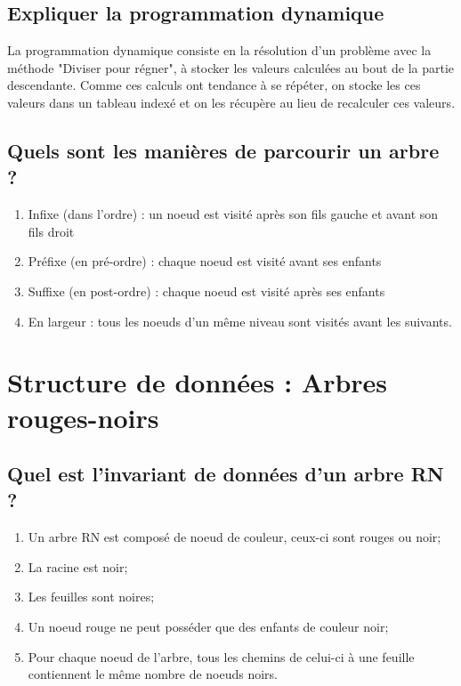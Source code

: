 \documentclass[11pt]{article}
\begin{document}
\subsection{Expliquer la programmation dynamique}

La programmation dynamique consiste en la résolution d’un problème avec la méthode "Diviser pour régner", à stocker les valeurs calculées au bout de la partie descendante. Comme ces calculs ont tendance à se répéter, on stocke les ces valeurs dans un tableau indexé et on les récupère au lieu de recalculer ces valeurs.

\subsection{Quels sont les manières de parcourir un arbre ?}

\begin{enumerate}
	\item Infixe (dans l'ordre) : un noeud est visité après son fils gauche et avant son fils droit
	\item Préfixe (en pré-ordre) : chaque noeud est visité avant ses enfants
	\item Suffixe (en post-ordre) : chaque noeud est visité après ses enfants
	\item En largeur : tous les noeuds d'un même niveau sont visités avant les suivants.
\end{enumerate}

\section{Structure de données : Arbres rouges-noirs}

\subsection{Quel est l'invariant de données d'un arbre RN ?}

\begin{enumerate}
	\item Un arbre RN est composé de noeud de couleur, ceux-ci sont rouges ou noir;
	\item La racine est noir;
	\item Les feuilles sont noires;
	\item Un noeud rouge ne peut posséder que des enfants de couleur noir;
	\item Pour chaque noeud de l'arbre, tous les chemins de celui-ci à une feuille contiennent le même nombre de noeuds noirs. 
\end{enumerate}
\end{document}
